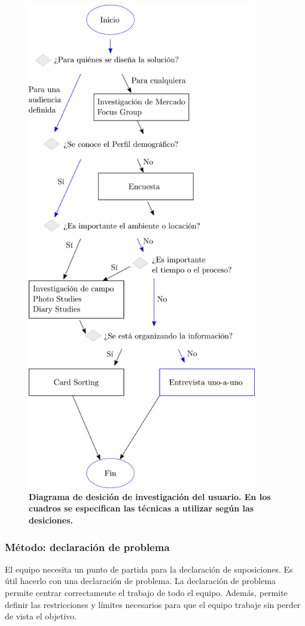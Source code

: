 \begin{figure}[h]
\includegraphics[width=10cm]{Img/CPD/3-flow.png}
\centering
\caption{\textbf{ \footnotesize{Diagrama de desición de investigación del usuario. En los cuadros se especifican las técnicas a utilizar según las desiciones.}}}
\label{fig:diagrama-desicion}
\end{figure}



\subsubsection{Método: declaración de problema}
El equipo necesita un punto de partida para la declaración de suposiciones. Es útil hacerlo con una declaración de problema. La declaración de problema permite centrar correctamente el trabajo de todo el equipo. Además, permite definir las restricciones y límites necesarios para que el equipo trabaje sin perder de vista el objetivo.

